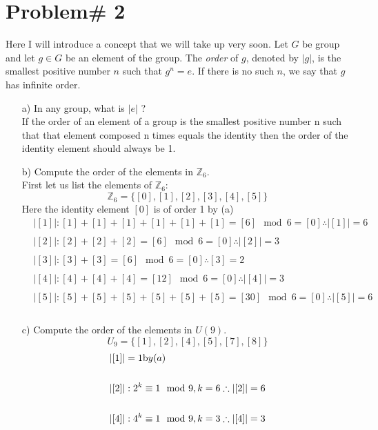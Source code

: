 \documentclass[11pt]{article}
\theoremstyle{definition}  %
\newcommand{\Z}{\mathbb{Z}}
\begin{document}
\section* {Problem# 2}
Here I will introduce a concept that we will take up very soon. Let $G$ be  group and let $g \in G$ be an element of the group. The {\it order} of $g$, denoted by $|g|$,
  is the smallest positive number $n$ such that $g^n = e$. If there is no such $n$, we say that $g$ has infinite order.
  \begin{itemize}
     \item[a)] In any group, what is $|e|$ ?\\
     If the order of an element of a group is the smallest positive number n such that that element composed n times equals the identity then the order of the identity element should always be 1.
     \item[b)] Compute the order of the elements in $\Z_6$.\\
     First let us list the elements of $\Z_6$:
     \[
      \Z_6=\{[0],[1],[2],[3],[4],[5]\}
     \]
     Here the identity element $[0]$ is of order 1 by (a)\\
     \begin{align*}
       &|[1]|:[1]+[1]+[1]+[1]+[1]+[1]=[6]\mod 6=[0]\therefore|[1]|=6\\\\
       &|[2]|:[2]+[2]+[2]=[6]\mod 6=[0]\therefore |[2]|=3\\\\
       &|[3]|:[3]+[3]=[6]\mod 6=[0]\therefore [3]=2\\\\
       &|[4]|:[4]+[4]+[4]=[12]\mod 6=[0]\therefore |[4]|=3\\\\
       &|[5]|:[5]+[5]+[5]+[5]+[5]+[5]=[30]\mod 6=[0]\therefore |[5]|=6\\\\
     \end{align*}
     \item[c)] Compute the order of the elements in $U(9)$.
     \[
       U_9=\{[1],[2],[4],[5],[7],[8]\}
     \]
     \begin{align*}
       &|[1]|=1\text by (a)\\\\
       &|[2]|:2^k\equiv 1 \mod 9, k=6\therefore |[2]|=6\\\\
       &|[4]|:4^k\equiv 1 \mod 9, k=3\therefore |[4]|=3\\\\

\end{align*}
\end{itemize}
\end{document}
